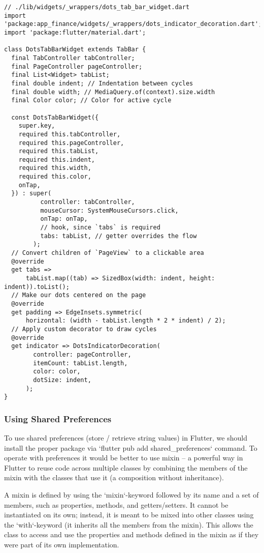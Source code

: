 \begin{lstlisting}
// ./lib/widgets/_wrappers/dots_tab_bar_widget.dart
import 'package:app_finance/widgets/_wrappers/dots_indicator_decoration.dart';
import 'package:flutter/material.dart';

class DotsTabBarWidget extends TabBar {
  final TabController tabController;
  final PageController pageController;
  final List<Widget> tabList;
  final double indent; // Indentation between cycles
  final double width; // MediaQuery.of(context).size.width
  final Color color; // Color for active cycle

  const DotsTabBarWidget({
    super.key,
    required this.tabController,
    required this.pageController,
    required this.tabList,
    required this.indent,
    required this.width,
    required this.color,
    onTap,
  }) : super(
          controller: tabController,
          mouseCursor: SystemMouseCursors.click,
          onTap: onTap,
          // hook, since `tabs` is required
          tabs: tabList, // getter overrides the flow
        );
  // Convert children of `PageView` to a clickable area 
  @override
  get tabs =>
      tabList.map((tab) => SizedBox(width: indent, height: indent)).toList();
  // Make our dots centered on the page
  @override
  get padding => EdgeInsets.symmetric(
      horizontal: (width - tabList.length * 2 * indent) / 2);
  // Apply custom decorator to draw cycles
  @override
  get indicator => DotsIndicatorDecoration(
        controller: pageController,
        itemCount: tabList.length,
        color: color,
        dotSize: indent,
      );
}
\end{lstlisting}

\subsubsection{Using Shared Preferences}

To use shared preferences (store / retrieve string values) in Flutter, we should install the proper package via
`flutter pub add shared\_preferences` command. To operate with preferences it would be better to use mixin --
a powerful way in Flutter to reuse code across multiple classes by combining the members of the mixin with the 
classes that use it (a composition without inheritance).

A mixin is defined by using the `mixin`-keyword followed by its name and a set of members, such as properties, methods, 
and getters/setters. It cannot be instantiated on its own; instead, it is meant to be mixed into other classes 
using the `with`-keyword (it inherits all the members from the mixin). This allows the class to access and use the 
properties and methods defined in the mixin as if they were part of its own implementation.

